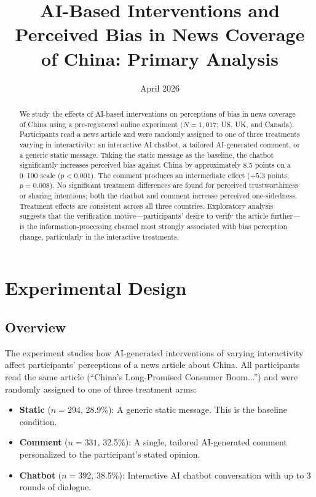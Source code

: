 \documentclass[12pt]{article}
\title{AI-Based Interventions and Perceived Bias in News Coverage of China: Primary Analysis}
\author{}
\date{April 2026}
\begin{document}
\maketitle

\begin{abstract}
\noindent We study the effects of AI-based interventions on perceptions of bias in news coverage of China using a pre-registered online experiment ($N=1{,}017$; US, UK, and Canada). Participants read a news article and were randomly assigned to one of three treatments varying in interactivity: an interactive AI chatbot, a tailored AI-generated comment, or a generic static message. Taking the static message as the baseline, the chatbot significantly increases perceived bias against China by approximately 8.5 points on a 0--100 scale ($p<0.001$). The comment produces an intermediate effect ($+5.3$ points, $p=0.008$). No significant treatment differences are found for perceived trustworthiness or sharing intentions; both the chatbot and comment increase perceived one-sidedness. Treatment effects are consistent across all three countries. Exploratory analysis suggests that the verification motive---participants' desire to verify the article further---is the information-processing channel most strongly associated with bias perception change, particularly in the interactive treatments.
\end{abstract}

\section{Experimental Design}

\subsection{Overview}

The experiment studies how AI-generated interventions of varying interactivity affect participants' perceptions of a news article about China. All participants read the same article (``China's Long-Promised Consumer Boom...'') and were randomly assigned to one of three treatment arms:

\begin{itemize}
    \item \textbf{Static} ($n=294$, 28.9\%): A generic static message. This is the baseline condition.
    \item \textbf{Comment} ($n=331$, 32.5\%): A single, tailored AI-generated comment personalized to the participant's stated opinion.
    \item \textbf{Chatbot} ($n=392$, 38.5\%): Interactive AI chatbot conversation with up to 3 rounds of dialogue.
\end{itemize}
\end{document}
